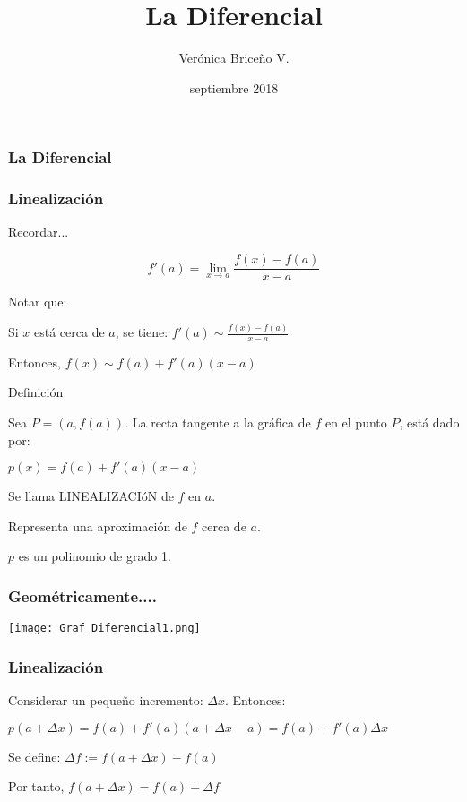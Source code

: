 \documentclass[utf8x]{beamer}
\title{La Diferencial}
\author{Verónica Brice\~no V.}
\date{septiembre 2018}
\begin{document}
\begin{frame}
\frametitle{La Diferencial}
\titlepage
\end{frame}



\begin{frame}
\frametitle{Linealización}

\begin{block}{Recordar...}

$$f'(a) = \lim_{x\rightarrow a} \frac{f(x) - f(a)}{x-a}$$

\end{block}


Notar que:

Si $x$ está cerca de $a$, se tiene:
$f'(a)  \sim \frac{f(x) - f(a)}{x-a}$


Entonces,
$f(x)  \sim  f(a)  + f'(a)(x-a)$



\begin{block}{Definición}

Sea $P=(a,f(a))$. La recta tangente a la gráfica de $f$ en el punto $P$, está dado por:


$p(x) =  f(a)  + f'(a)(x-a)$

Se llama LINEALIZACIóN de $f$ en $a$.


Representa una aproximación de $f$ cerca de  $a$.


$p$ es un polinomio de grado 1.

\end{block}

\end{frame}


\begin{frame}
\frametitle{Geométricamente....}

\begin{center}
\texttt{[image: Graf\_Diferencial1.png]}

\end{center}

\end{frame}




\begin{frame}
\frametitle{Linealización}

Considerar un pequeño incremento: $\Delta x$.
Entonces:

$p(a+\Delta x) = f(a) + f'(a)(a + \Delta x - a) = f(a)+f'(a)\Delta x $

Se define: $\Delta f := f(a+\Delta x) - f(a)$


Por tanto, $ f(a+\Delta x)  = f(a) +\Delta f$

\end{frame}
\end{document}
